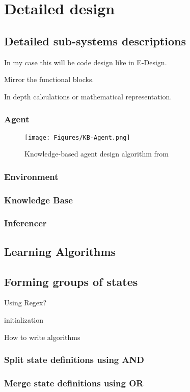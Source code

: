 \chapter{Detailed design} 

\section{Detailed sub-systems descriptions}

In my case this will be code design like in E-Design.

Mirror the functional blocks.

In depth calculations or mathematical representation.

\subsection{Agent}

\begin{figure}[H]
    \centering
    \texttt{[image: Figures/KB-Agent.png]}
    \caption{Knowledge-based agent design algorithm from \cite{russell2016artificial}}
    \label{fig:sysdiag}
\end{figure}

	
\subsection{Environment}



\subsection{Knowledge Base}



\subsection{Inferencer}



\section{Learning Algorithms} 

\section{Forming groups of states}
Using Regex?

\begin{algorithm}[H]
\SetAlgoLined
{}
 initialization\;
 \caption{How to write algorithms}
\end{algorithm}


\subsection{Split state definitions using AND}
	
\subsection{Merge state definitions using OR}
